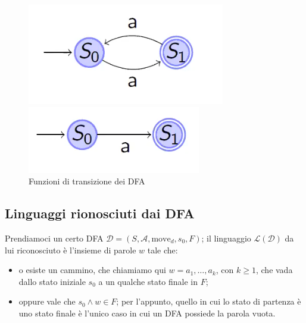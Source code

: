 \documentclass[class=book, crop=false, oneside, 12pt]{standalone}
\begin{document}
\begin{figure}[H]
    \begin{minipage}{0.4\textwidth}
        \centering
        \includegraphics[width=\textwidth,keepaspectratio]{DFA-move-total.png}
    \end{minipage}
    \hfill
    \begin{minipage}{0.4\textwidth}
        \centering
        \includegraphics[width=\textwidth,keepaspectratio]{DFA-move-partial.png}
    \end{minipage}
    \caption{Funzioni di transizione dei DFA}
\end{figure}

\subsection{Linguaggi rionosciuti dai DFA}
Prendiamoci un certo DFA \(\mathcal{D} = (S, \mathcal{A}, \textrm{move}_d, s_0, F)\); il linguaggio \(\mathcal{L(D)}\) da lui riconosciuto è l'insieme di parole \(w\) tale che:

\begin{itemize}
    \item o esiste un cammino, che chiamiamo qui \(w = a_1, \ldots, a_k\), con \(k \ge 1\), che vada dallo stato iniziale \(s_0\) a un qualche stato finale in \(F\);
    \item oppure vale che \(s_0 \land w \in F\); per l'appunto, quello in cui lo stato di partenza è uno stato finale è l'unico caso in cui un DFA possiede la parola vuota.
\end{itemize}
\end{document}
